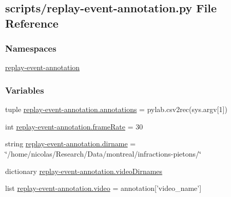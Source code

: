 \hypertarget{replay-event-annotation_8py}{\subsection{scripts/replay-\/event-\/annotation.py File Reference}
\label{replay-event-annotation_8py}
}
\subsubsection*{Namespaces}
\begin{DoxyCompactItemize}
\item 
\hyperlink{namespacereplay-event-annotation}{replay-\/event-\/annotation}
\end{DoxyCompactItemize}
\subsubsection*{Variables}
\begin{DoxyCompactItemize}
\item 
tuple \hyperlink{namespacereplay-event-annotation_aa9d30de64f986accd6450e022aa67577}{replay-\/event-\/annotation.\-annotations} = pylab.\-csv2rec(sys.\-argv\mbox{[}1\mbox{]})
\item 
int \hyperlink{namespacereplay-event-annotation_a71eea50b81803515087ff66cbc3cdb68}{replay-\/event-\/annotation.\-frame\-Rate} = 30
\item 
string \hyperlink{namespacereplay-event-annotation_aec1a96e110f52d9128022f8759551b05}{replay-\/event-\/annotation.\-dirname} = \char`\"{}/home/nicolas/Research/Data/montreal/infractions-\/pietons/\char`\"{}
\item 
dictionary \hyperlink{namespacereplay-event-annotation_a2355d1bf8d72c28fc45e7e864ff43f5f}{replay-\/event-\/annotation.\-video\-Dirnames}
\item 
list \hyperlink{namespacereplay-event-annotation_a2ab142bc2d897e17680b45c778eb5a3e}{replay-\/event-\/annotation.\-video} = annotation\mbox{[}'video\-\_\-name'\mbox{]}
\end{DoxyCompactItemize}
